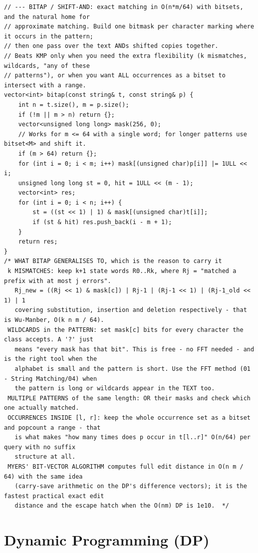 \documentclass[9pt,a4paper,twocolumn]{extarticle}
\begin{document}
\begin{lstlisting}
// --- BITAP / SHIFT-AND: exact matching in O(n*m/64) with bitsets, and the natural home for
// approximate matching. Build one bitmask per character marking where it occurs in the pattern;
// then one pass over the text ANDs shifted copies together.
// Beats KMP only when you need the extra flexibility (k mismatches, wildcards, "any of these
// patterns"), or when you want ALL occurrences as a bitset to intersect with a range.
vector<int> bitap(const string& t, const string& p) {
    int n = t.size(), m = p.size();
    if (!m || m > n) return {};
    vector<unsigned long long> mask(256, 0);
    // Works for m <= 64 with a single word; for longer patterns use bitset<M> and shift it.
    if (m > 64) return {};
    for (int i = 0; i < m; i++) mask[(unsigned char)p[i]] |= 1ULL << i;
    unsigned long long st = 0, hit = 1ULL << (m - 1);
    vector<int> res;
    for (int i = 0; i < n; i++) {
        st = ((st << 1) | 1) & mask[(unsigned char)t[i]];
        if (st & hit) res.push_back(i - m + 1);
    }
    return res;
}
/* WHAT BITAP GENERALISES TO, which is the reason to carry it
 k MISMATCHES: keep k+1 state words R0..Rk, where Rj = "matched a prefix with at most j errors".
   Rj_new = ((Rj << 1) & mask[c]) | Rj-1 | (Rj-1 << 1) | (Rj-1_old << 1) | 1
   covering substitution, insertion and deletion respectively - that is Wu-Manber, O(k n m / 64).
 WILDCARDS in the PATTERN: set mask[c] bits for every character the class accepts. A '?' just
   means "every mask has that bit". This is free - no FFT needed - and is the right tool when the
   alphabet is small and the pattern is short. Use the FFT method (01 - String Matching/04) when
   the pattern is long or wildcards appear in the TEXT too.
 MULTIPLE PATTERNS of the same length: OR their masks and check which one actually matched.
 OCCURRENCES INSIDE [l, r]: keep the whole occurrence set as a bitset and popcount a range - that
   is what makes "how many times does p occur in t[l..r]" O(n/64) per query with no suffix
   structure at all.
 MYERS' BIT-VECTOR ALGORITHM computes full edit distance in O(n m / 64) with the same idea
   (carry-save arithmetic on the DP's difference vectors); it is the fastest practical exact edit
   distance and the escape hatch when the O(nm) DP is 1e10.  */
\end{lstlisting}

\section{Dynamic Programming (DP)}
\end{document}
